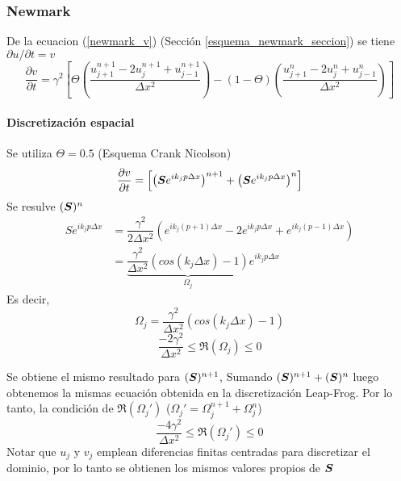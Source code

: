 \subsubsection{Newmark}

De la ecuacion (\ref{newmark_v}) (Sección \ref{esquema_newmark_seccion}) se tiene $\partial u / \partial t = v$
\begin{equation}
\dfrac{\partial v}{\partial t} = \gamma ^2 \left[ \Theta \left( \dfrac{ u_{j+1}^{n+1} -2u_{j}^{n+1} + u_{j-1}^{n+1} }{\Delta x^2} \right) - (1-\Theta) \left( \dfrac{ u_{j+1}^{n} -2u_{j}^{n} + u_{j-1}^{n} }{\Delta x^2} \right) \right]
\end{equation} 

\paragraph{Discretización espacial}

Se utiliza $\Theta=0.5$ (Esquema Crank Nicolson)
\begin{equation}
\dfrac{\partial v}{\partial t} = \left[ \left( \boldsymbol{S} e^{i k_j p \Delta x} \right)^{n+1} + \left( \boldsymbol{S} e^{i k_j p \Delta x} \right)^{n}  \right]
\end{equation}
Se resulve $(\boldsymbol{S})^n$
\begin{align*}
S e ^ { i k_j p \Delta x } &= \dfrac{\gamma^2}{2 \Delta x^2} \left( e ^ { i k_j (p+1) \Delta x } - 2 e ^ { i k_j p \Delta x } + e ^ { i k_j (p-1) \Delta x } \right) \\
&= \underbrace{\dfrac{\gamma^2}{\Delta x^2} \left( cos(k_j \Delta x) - 1 \right)}_{\Omega_j} e ^ { i k_j p \Delta x}
\end{align*}
Es decir,
\begin{equation} \label{OMEGA_j}
\Omega_j = \dfrac{\gamma^2}{\Delta x^2} \left( cos(k_j \Delta x) - 1 \right)
\end{equation}
\begin{equation} \label{CONDICION_OMEGA_j_NM}
\dfrac{-2 \gamma^2}{\Delta x^2} \leq \Re(\Omega_j) \leq 0
\end{equation}

Se obtiene el mismo resultado para $(\boldsymbol{S})^{n+1}$, Sumando $(\boldsymbol{S})^{n+1} + (\boldsymbol{S})^{n}$ luego obtenemos la mismas ecuación obtenida en la discretización Leap-Frog. Por lo tanto, la condición de $\Re(\Omega_j')$ ($\Omega_j' = \Omega_j^{n+1} + \Omega_j^{n}$)
\begin{equation}
\dfrac{-4 \gamma^2}{\Delta x^2} \leq \Re(\Omega_j') \leq 0
\end{equation}
Notar que $u_j$ y $v_j$ emplean diferencias finitas centradas para discretizar el dominio, por lo tanto se obtienen los mismos valores propios de $\boldsymbol{S}$

